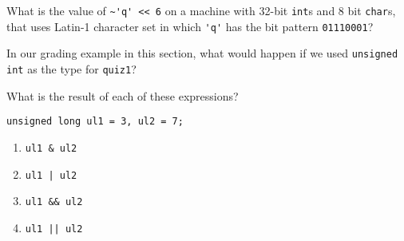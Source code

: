 %
%
\begin{question}
What is the value of \verb|~'q' << 6| on a machine with 32-bit
\verb|int|s and 8 bit \verb|char|s, that uses Latin-1 character set in which \verb|'q'| has the
bit pattern \verb|01110001|?
\end{question}

\begin{question}
In our grading example in this section, what would happen if
we used \verb|unsigned int| as the type for \verb|quiz1|?
\end{question}

\begin{question}
What is the result of each of these expressions?
\begin{lstlisting}
unsigned long ul1 = 3, ul2 = 7;
\end{lstlisting}
\begin{enumerate}[label=(\alph*)]
^^I\item \verb|ul1 & ul2|
^^I\item \verb=ul1 | ul2=
^^I\item \verb=ul1 && ul2=
^^I\item \verb=ul1 || ul2=
\end{enumerate}
\end{question}
